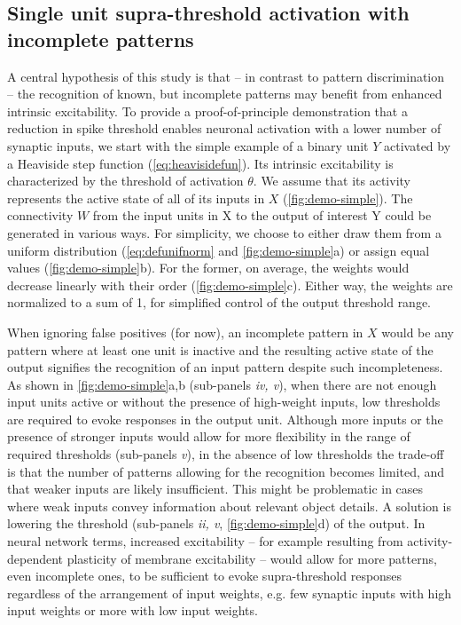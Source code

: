\subsection{Single unit supra-threshold activation with incomplete patterns}



A central hypothesis of this study is that -- in contrast to pattern discrimination -- the recognition of known,
        but incomplete patterns may benefit from enhanced intrinsic excitability.
    To provide a proof-of-principle demonstration
        that a reduction in spike threshold enables neuronal activation with a lower number of synaptic inputs,
        we start with the simple example of
        a binary unit $Y$ activated by a Heaviside step function (\autoref{eq:heavisidefun}).
    Its intrinsic excitability is characterized by the threshold of activation  $\theta$.
    We assume that its activity represents the active state of all of its inputs in $X$ (\autoref{fig:demo-simple}).
    The connectivity $W$ from the input units in X to the output of interest Y could be generated in various ways.
    For simplicity, we choose to either draw them from
        a uniform distribution (\autoref{eq:defunifnorm} and \autoref{fig:demo-simple}a)
        or assign equal values (\autoref{fig:demo-simple}b).
    For the former, on average, the weights would decrease linearly with their order (\autoref{fig:demo-simple}c).
    Either way, the weights are normalized to a sum of 1, for simplified control of the output threshold range.

When ignoring false positives (for now), an incomplete pattern in $X$ would be any pattern where
        at least one unit is inactive
        and the resulting active state of the output signifies the recognition of an input pattern despite such incompleteness.
    As shown in \autoref{fig:demo-simple}a,b (sub-panels \textit{iv, v}),
        when there are not enough input units active
        or without the presence of high-weight inputs,
        low thresholds are required to evoke responses in the output unit.
    Although more inputs or the presence of stronger inputs would allow for more flexibility in the range of required thresholds (sub-panels \textit{v}),
        in the absence of low thresholds the trade-off is that the number of patterns allowing for the recognition becomes limited,
        and that weaker inputs are likely insufficient.
    This might be problematic in cases where weak inputs convey information about relevant object details.
    A solution is lowering the threshold (sub-panels \textit{ii, v}, \autoref{fig:demo-simple}d) of the output.
    In neural network terms, increased excitability
        -- for example resulting from activity-dependent plasticity of membrane excitability --
        would allow for more patterns, even incomplete ones,
        to be sufficient to evoke supra-threshold responses regardless of the arrangement of input weights,
        e.g. few synaptic inputs with high input weights or more with low input weights.

